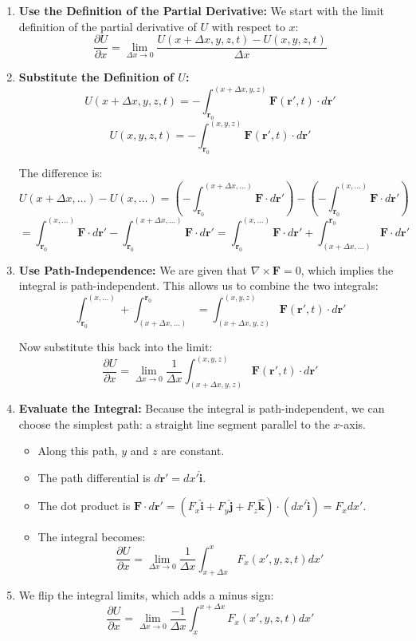 \documentclass[11pt, a4paper]{article} %
\begin{document}
\begin{enumerate}
    \item \textbf{Use the Definition of the Partial Derivative:}
    We start with the limit definition of the partial derivative of $U$ with respect to $x$:
    $$\frac{\partial U}{\partial x} = \lim_{\Delta x \to 0} \frac{U(x+\Delta x, y, z, t) - U(x, y, z, t)}{\Delta x}$$

    \item \textbf{Substitute the Definition of $U$:}
    $$U(x+\Delta x, y, z, t) = - \int_{\mathbf{r}_0}^{(x+\Delta x, y, z)} \mathbf{F}(\mathbf{r}', t) \cdot d\mathbf{r}'$$
    $$U(x, y, z, t) = - \int_{\mathbf{r}_0}^{(x, y, z)} \mathbf{F}(\mathbf{r}', t) \cdot d\mathbf{r}'$$
    
    The difference is:
    $$U(x+\Delta x, \dots) - U(x, \dots) = \left( - \int_{\mathbf{r}_0}^{(x+\Delta x, \dots)} \mathbf{F} \cdot d\mathbf{r}' \right) - \left( - \int_{\mathbf{r}_0}^{(x, \dots)} \mathbf{F} \cdot d\mathbf{r}' \right)$$
    $$= \int_{\mathbf{r}_0}^{(x, \dots)} \mathbf{F} \cdot d\mathbf{r}' - \int_{\mathbf{r}_0}^{(x+\Delta x, \dots)} \mathbf{F} \cdot d\mathbf{r}' = \int_{\mathbf{r}_0}^{(x, \dots)} \mathbf{F} \cdot d\mathbf{r}' + \int_{(x+\Delta x, \dots)}^{\mathbf{r}_0} \mathbf{F} \cdot d\mathbf{r}'$$

    \item \textbf{Use Path-Independence:}
    We are given that $\nabla \times \mathbf{F} = 0$, which implies the integral is path-independent. This allows us to combine the two integrals:
    $$\int_{\mathbf{r}_0}^{(x, \dots)} + \int_{(x+\Delta x, \dots)}^{\mathbf{r}_0} = \int_{(x+\Delta x, y, z)}^{(x, y, z)} \mathbf{F}(\mathbf{r}', t) \cdot d\mathbf{r}'$$
    
    Now substitute this back into the limit:
    $$\frac{\partial U}{\partial x} = \lim_{\Delta x \to 0} \frac{1}{\Delta x} \int_{(x+\Delta x, y, z)}^{(x, y, z)} \mathbf{F}(\mathbf{r}', t) \cdot d\mathbf{r}'$$

    \item \textbf{Evaluate the Integral:}
    Because the integral is path-independent, we can choose the simplest path: a straight line segment parallel to the $x$-axis.
    \begin{itemize}
        \item Along this path, $y$ and $z$ are constant.
        \item The path differential is $d\mathbf{r}' = dx' \hat{\mathbf{i}}$.
        \item The dot product is $\mathbf{F} \cdot d\mathbf{r}' = (F_x \hat{\mathbf{i}} + F_y \hat{\mathbf{j}} + F_z \hat{\mathbf{k}}) \cdot (dx' \hat{\mathbf{i}}) = F_x dx'$.
        \item The integral becomes:
        $$\frac{\partial U}{\partial x} = \lim_{\Delta x \to 0} \frac{1}{\Delta x} \int_{x+\Delta x}^{x} F_x(x', y, z, t) dx'$$
    \end{itemize}
    \item We flip the integral limits, which adds a minus sign:
    $$\frac{\partial U}{\partial x} = \lim_{\Delta x \to 0} \frac{-1}{\Delta x} \int_{x}^{x+\Delta x} F_x(x', y, z, t) dx'$$


\end{enumerate}
\end{document}
